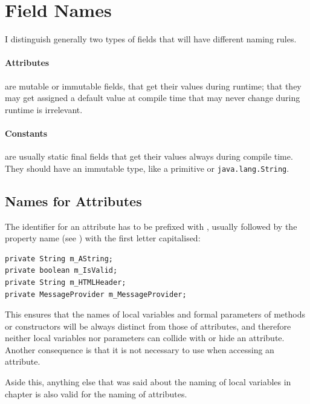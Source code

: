 \section{Field Names}\label{sec:Fields}
I distinguish generally two types of fields that will have different naming rules.

\paragraph{Attributes} are mutable or immutable fields, that get their values during runtime; that they may get assigned a default value at compile time that may never change during runtime is irrelevant.

\paragraph{Constants} are usually static final fields that get their values always during compile time. They should have an immutable type, like a primitive or \lstinline|java.lang.String|.


\subsection{Names for Attributes}\label{sec:AttributeNames}
The identifier for an attribute has to be prefixed with , usually followed by the property name (see ) with the first letter capitalised:
\begin{lstlisting}
private String m_AString;
private boolean m_IsValid;
private String m_HTMLHeader;
private MessageProvider m_MessageProvider;
\end{lstlisting}
This ensures that the names of local variables and formal parameters of methods or constructors will be always distinct from those of attributes, and therefore neither local variables nor parameters can collide with or hide an attribute. Another consequence is that it is not necessary to use  when accessing an attribute.

Aside this, anything else that was said about the naming of local variables in chapter  is also valid for the naming of attributes.

